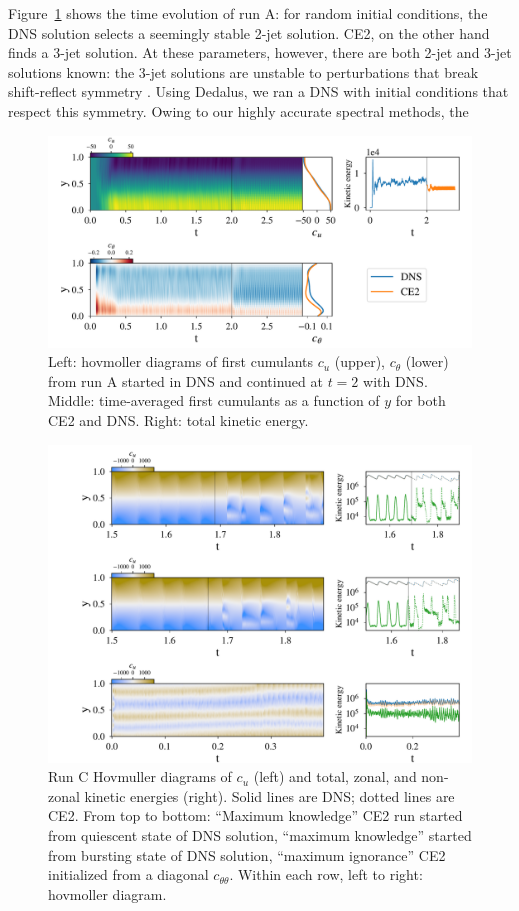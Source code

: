 \documentclass{jfm}
\newcommand{\cu}{c_u}
\newcommand{\ctt}{c_{\theta \theta}}
\begin{document}
Figure~\ref{fig:run_A} shows the time evolution of run A: for random initial conditions, the DNS solution selects a seemingly stable 2-jet solution.
CE2, on the other hand finds a 3-jet solution.
At these parameters, however, there are both 2-jet and 3-jet solutions known: the 3-jet solutions are unstable to perturbations that break shift-reflect symmetry \citep{bh1993}. Using Dedalus, we ran a DNS with initial conditions that respect this symmetry. Owing to our highly accurate spectral methods, the 
\begin{figure}
  \centering
  \includegraphics[width=\textwidth]{../../figs/run_A_fig.pdf}
  \caption{Left: hovmoller diagrams of first cumulants $\cu$ (upper), $c_\theta$ (lower) from run A started in DNS and continued at $t=2$ with DNS. Middle: time-averaged first cumulants as a function of $y$ for both CE2 and DNS. Right: total kinetic energy.}
  \label{fig:run_A}
\end{figure}

\begin{figure}
  \centering
  \includegraphics[width=\textwidth]{../../figs/run_C_fig.pdf}
  \caption{Run C Hovmuller diagrams of $\cu$ (left) and total, zonal, and non-zonal kinetic energies (right). Solid lines are DNS; dotted lines are CE2. From top to bottom: ``Maximum knowledge'' CE2 run started from quiescent state of DNS solution, ``maximum knowledge'' started from bursting state of DNS solution, ``maximum ignorance'' CE2 initialized from a diagonal $\ctt$. Within each row, left to right: hovmoller diagram. }
  \label{fig:run_C}
\end{figure}
\end{document}
